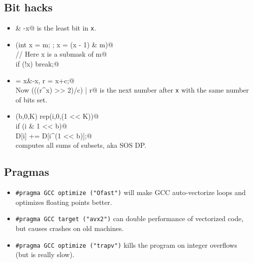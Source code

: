 	\subsection{Bit hacks}
		\begin{itemize}
			\item \verb@x & -x@ is the least bit in \texttt{x}.
      \item \verb@for (int x = m; ; x = (x - 1) & m)@ \\ \verb@  // Here x is a submask of m@ \\ \verb@  if (!x) break;@ 
			\item \verb@c = x&-x, r = x+c;@ \\ Now \verb@ (((r^x) >> 2)/c) | r@ is the next number after \texttt{x} with the same number of bits set.
			\item \verb@rep(b,0,K) rep(i,0,(1 << K))@ \\ \verb@  if (i & 1 << b)@ \\ \verb@    D[i] += D[i^(1 << b)];@ \\computes all sums of subsets, aka SOS DP.
		\end{itemize}


	\subsection{Pragmas}
		\begin{itemize}
			\item \lstinline{#pragma GCC optimize ("Ofast")} will make GCC auto-vectorize loops and optimizes floating points better.
			\item \lstinline{#pragma GCC target ("avx2")} can double performance of vectorized code, but causes crashes on old machines.
			\item \lstinline{#pragma GCC optimize ("trapv")} kills the program on integer overflows (but is really slow).
		\end{itemize}
